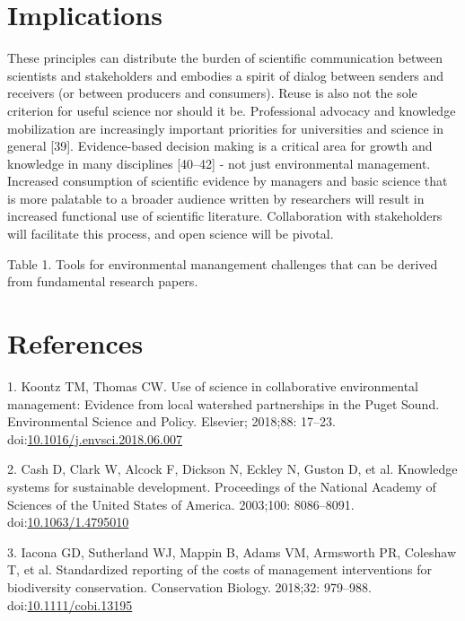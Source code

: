 \documentclass[10pt,letterpaper]{article}
\begin{document}
\section{Implications}\label{implications}

These principles can distribute the burden of scientific communication
between scientists and stakeholders and embodies a spirit of dialog
between senders and receivers (or between producers and consumers).
Reuse is also not the sole criterion for useful science nor should it
be. Professional advocacy and knowledge mobilization are increasingly
important priorities for universities and science in general {[}39{]}.
Evidence-based decision making is a critical area for growth and
knowledge in many disciplines {[}40--42{]} - not just environmental
management. Increased consumption of scientific evidence by managers and
basic science that is more palatable to a broader audience written by
researchers will result in increased functional use of scientific
literature. Collaboration with stakeholders will facilitate this
process, and open science will be pivotal.

Table 1. Tools for environmental manangement challenges that can be
derived from fundamental research papers.

\section*{References}\label{references}

\hypertarget{refs}{}
\hypertarget{ref-Koontz2018}{}
1. Koontz TM, Thomas CW. Use of science in collaborative environmental
management: Evidence from local watershed partnerships in the Puget
Sound. Environmental Science and Policy. Elsevier; 2018;88: 17--23.
doi:\href{https://doi.org/10.1016/j.envsci.2018.06.007}{10.1016/j.envsci.2018.06.007}

\hypertarget{ref-Cash2003}{}
2. Cash D, Clark W, Alcock F, Dickson N, Eckley N, Guston D, et al.
Knowledge systems for sustainable development. Proceedings of the
National Academy of Sciences of the United States of America. 2003;100:
8086--8091.
doi:\href{https://doi.org/10.1063/1.4795010}{10.1063/1.4795010}

\hypertarget{ref-Iacona2018}{}
3. Iacona GD, Sutherland WJ, Mappin B, Adams VM, Armsworth PR, Coleshaw
T, et al. Standardized reporting of the costs of management
interventions for biodiversity conservation. Conservation Biology.
2018;32: 979--988.
doi:\href{https://doi.org/10.1111/cobi.13195}{10.1111/cobi.13195}
\end{document}

